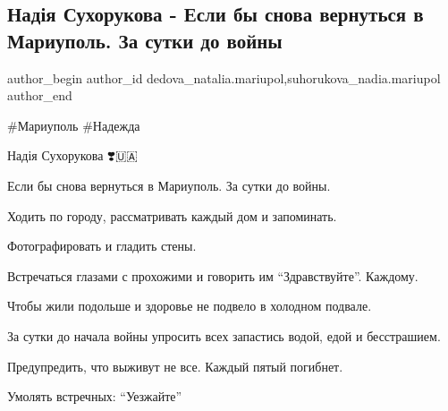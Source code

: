  
 
 
 
 

\subsection{Надія Сухорукова - Если бы снова вернуться в Мариуполь.  За сутки  до войны}
\label{sec:06_09_2022.fb.dedova_natalia.mariupol.1.suhorukova_esli_by_snova_vernutsja_v_mariupol_za_sutki_do_vojny}
 
\ifcmt
 author_begin
   author_id dedova_natalia.mariupol,suhorukova_nadia.mariupol
 author_end
\fi

\#Мариуполь \#Надежда

Надія Сухорукова ❣️🇺🇦

Если бы снова вернуться в Мариуполь.  За сутки  до войны. 


Ходить  по городу, рассматривать каждый дом и запоминать.  

Фотографировать и гладить стены. 

Встречаться глазами с прохожими и говорить им \enquote{Здравствуйте}. Каждому. 

Чтобы жили подольше и здоровье не подвело в холодном подвале. 

За сутки до начала войны упросить   всех  запастись  водой, едой и бесстрашием. 

Предупредить, что выживут не все. Каждый пятый погибнет. 

Умолять встречных: \enquote{Уезжайте} 

